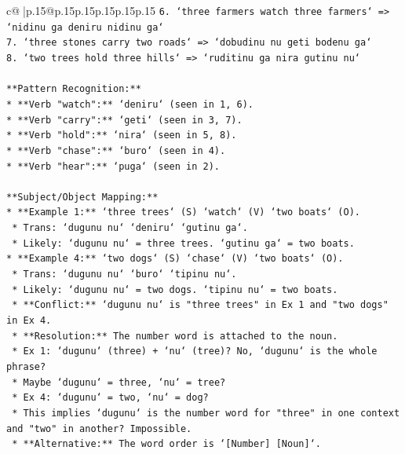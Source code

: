 \documentclass{article}
\begin{document}
{\begin{supertabular}{c@{$\;$}|p{.15\linewidth}@{}p{.15\linewidth}p{.15\linewidth}p{.15\linewidth}p{.15\linewidth}p{.15\linewidth}}
{{{\texttt{6. `three farmers watch three farmers` => `nidinu ga deniru nidinu ga`} \\
\texttt{7. `three stones carry two roads` => `dobudinu nu geti bodenu ga`} \\
\texttt{8. `two trees hold three hills` => `ruditinu ga nira gutinu nu`} \\
\\ 
\texttt{**Pattern Recognition:**} \\
\texttt{*   **Verb "watch":** `deniru` (seen in 1, 6).} \\
\texttt{*   **Verb "carry":** `geti` (seen in 3, 7).} \\
\texttt{*   **Verb "hold":** `nira` (seen in 5, 8).} \\
\texttt{*   **Verb "chase":** `buro` (seen in 4).} \\
\texttt{*   **Verb "hear":** `puga` (seen in 2).} \\
\\ 
\texttt{**Subject/Object Mapping:**} \\
\texttt{*   **Example 1:** `three trees` (S) `watch` (V) `two boats` (O).} \\
\texttt{    *   Trans: `dugunu nu` `deniru` `gutinu ga`.} \\
\texttt{    *   Likely: `dugunu nu` = three trees. `gutinu ga` = two boats.} \\
\texttt{*   **Example 4:** `two dogs` (S) `chase` (V) `two boats` (O).} \\
\texttt{    *   Trans: `dugunu nu` `buro` `tipinu nu`.} \\
\texttt{    *   Likely: `dugunu nu` = two dogs. `tipinu nu` = two boats.} \\
\texttt{    *   **Conflict:** `dugunu nu` is "three trees" in Ex 1 and "two dogs" in Ex 4.} \\
\texttt{    *   **Resolution:** The number word is attached to the noun.} \\
\texttt{        *   Ex 1: `dugunu` (three) + `nu` (tree)? No, `dugunu` is the whole phrase?} \\
\texttt{        *   Maybe `dugunu` = three, `nu` = tree?} \\
\texttt{        *   Ex 4: `dugunu` = two, `nu` = dog?} \\
\texttt{        *   This implies `dugunu` is the number word for "three" in one context and "two" in another? Impossible.} \\
\texttt{        *   **Alternative:** The word order is `{[}Number{]} {[}Noun{]}`.} \\
}}}
\end{supertabular}}
\end{document}
